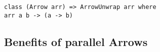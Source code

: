 \begin{lstlisting}[frame=htrbl]
class (Arrow arr) => ArrowUnwrap arr where
arr a b -> (a -> b)
\end{lstlisting}

\frbreak

\subsection{Benefits of parallel Arrows}

